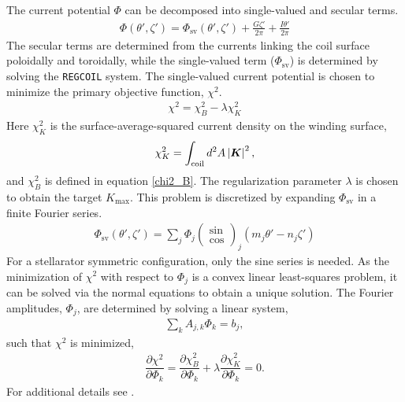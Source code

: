 \documentclass[aps,unsortedaddress]{revtex4-1}
\newcommand{\partder}[2]{\dfrac{\partial  #1}{\partial  #2}}
\begin{document}
The current potential $\Phi$ can be decomposed into single-valued and secular terms.
\begin{gather}
\Phi(\theta', \zeta') = \Phi_{\text{sv}}(\theta',\zeta') + \frac{ G \zeta'}{2 \pi} + \frac{I \theta'}{2 \pi}
\end{gather}
The secular terms are determined from the currents linking the coil surface poloidally and toroidally, while the single-valued term ($\Phi_{\text{sv}}$) is determined by solving the \texttt{REGCOIL} system. The single-valued current potential is chosen to minimize the primary objective function, $\chi^2$.
\begin{gather}
\chi^2 = \chi^2_B - \lambda \chi^2_K
\label{primary_objective}
\end{gather}
Here $\chi^2_K$ is the surface-average-squared current density on the winding surface,
\begin{gather}
\chi^2_K = \int_{\text{coil}} d^2A \, \abs{\bm{K}}^2,
\end{gather}
and $\chi^2_B$ is defined in equation \ref{chi2_B}. The regularization parameter $\lambda$ is chosen to obtain the target $K_{\text{max}}$. This problem is discretized by expanding $\Phi_{\text{sv}}$ in a finite Fourier series.
\begin{gather}
\Phi_{\text{sv}}(\theta',\zeta') = \sum_j \Phi_j \left( \begin{array}{c} \sin \\ \cos \end{array} \right)_j (m_j \theta' - n_j \zeta')
\end{gather}
For a stellarator symmetric configuration, only the sine series is needed. As the minimization of $\chi^2$ with respect to $\Phi_{j}$ is a convex linear least-squares problem, it can be solved via the normal equations to obtain a unique solution. The Fourier amplitudes, $\Phi_j$, are determined by solving a linear system,
\begin{gather}
\sum_k A_{j,k} \Phi_k = b_j,
\label{forward}
\end{gather}
such that $\chi^2$ is minimized,
\begin{gather}
\partder{\chi^2}{\Phi_k} = \partder{\chi^2_B}{\Phi_k} + \lambda \partder{\chi^2_K}{\Phi_k} = 0.
\label{regcoil_minimization}
\end{gather}
For additional details see \cite{Landreman2017}.
\end{document}
